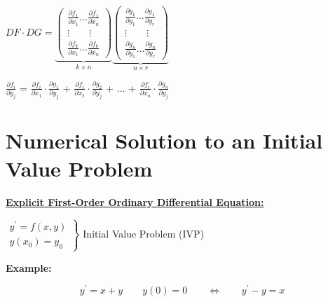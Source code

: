 \documentclass[a4paper,12pt]{report}
\begin{document}
	\begin{center}
		$ DF \cdot DG =
		\underbrace{
		\begin{pmatrix}
			\frac{\partial f_1}{\partial x_1}...\frac{\partial f_1}{\partial x_n} \\
			\vdots \qquad \vdots \\
			\frac{\partial f_k}{\partial x_1}...\frac{\partial f_k}{\partial x_n}	
		\end{pmatrix}}_{k \times n}
		\underbrace{
		\begin{pmatrix}
			\frac{\partial g_1}{\partial y_1}...\frac{\partial g_1}{\partial y_r} \\
			\vdots \qquad \vdots \\
			\frac{\partial g_n}{\partial y_1}...\frac{\partial g_n}{\partial y_r}	
		\end{pmatrix}}_{n \times r}
		$

		
	\vspace{1cm}
	\fbox
	{
		\parbox{0.7\textwidth}{
		\begin{center}
		\Large
			$\frac{\partial f_i}{\partial y_j}$ \large = \Large
			$\frac{\partial f_i}{\partial x_1}\cdot \frac{\partial g_1}{\partial y_j}$ \large + \Large
			$\frac{\partial f_i}{\partial x_2} \cdot \frac{\partial g_2}{\partial y_j}$ \large + ... + \Large
			$\frac{\partial f_i}{\partial x_n} \cdot \frac{\partial g_n}{\partial y_j}$		
		\end{center}
		}
	}
	\end{center}
\chapter{Numerical Solution to an Initial Value Problem}

	\textbf{\underline{Explicit First-Order Ordinary Differential Equation:}}\\
	\begin{center}
	$	
  	\left.
  	\begin{array}{l}
		 y^\prime = f(x,y)\\
		y(x_0) = y_0
	\end{array}
  	\right\}
	$
	Initial Value Problem (IVP)
	\end{center}

	\vspace{5mm}
	\noindent \textbf{Example:}

	
	$$y^\prime = x + y \qquad y(0) = 0 \qquad \Leftrightarrow \qquad y^\prime - y = x$$
	
	\vspace{2.5mm}
	
\end{document}
